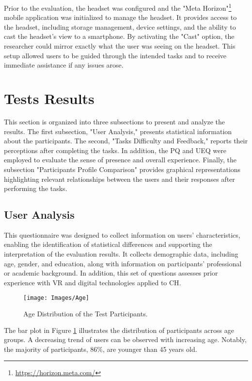 Prior to the evaluation, the headset was configured and the "Meta Horizon"\footnote{\url{https://horizon.meta.com/}} mobile application was initialized to manage the headset. 
It provides access to the headset, including storage management, device settings, and the ability to cast the headset's view to a smartphone.
By activating the "Cast" option, the researcher could mirror exactly what the user was seeing on the headset.
This setup allowed users to be guided through the intended tasks and to receive immediate assistance if any issues arose.

\section{Tests Results}
\label{sec:results}
This section is organized into three subsections to present and analyze the results. 
The first subsection, "User Analysis," presents statistical information about the participants. 
The second, "Tasks Difficulty and Feedback," reports their perceptions after completing the tasks. 
In addition, the \gls{PQ} and \gls{UEQ} were employed to evaluate the sense of presence and overall experience. 
Finally, the subsection "Participants Profile Comparison" provides graphical representations highlighting relevant relationships between the users and their responses after performing the tasks.

\subsection{User Analysis}
This questionnaire was designed to collect information on users' characteristics, enabling the identification of statistical differences and supporting the interpretation of the evaluation results. It collects demographic data, including age, gender, and education, along with information on participants' professional or academic background. 
In addition, this set of questions assesses prior experience with \gls{VR} and digital technologies applied to \gls{CH}.

\begin{figure}[h!]
    \centering
    \texttt{[image: Images/Age]}
    \caption{Age Distribution of the Test Participants.} 
    \label{fig:age}
\end{figure}

The bar plot in Figure \ref{fig:age} illustrates the distribution of participants across age groups. A decreasing trend of users can be observed with increasing age. Notably, the majority of participants, 86\%, are younger than 45 years old.

